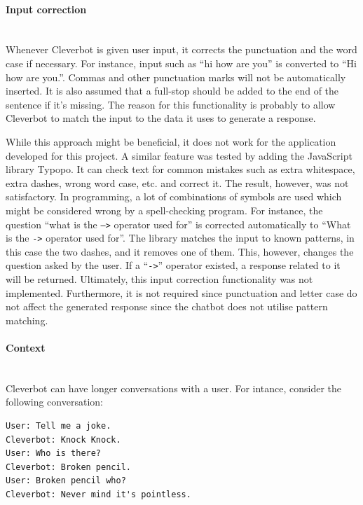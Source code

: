 \documentclass[12pt,a4paper]{article}
\newcommand{\myparagraph}[1]{\paragraph{#1}\mbox{}\\}
\begin{document}


\myparagraph{Input correction}
Whenever Cleverbot is given user input, it corrects the punctuation and the word case if necessary. For instance, input such as “hi how are you” is converted to “Hi how are you.”. Commas and other punctuation marks will not be automatically inserted. It is also assumed that a full-stop should be added to the end of the sentence if it’s missing. The reason for this functionality is probably to allow Cleverbot to match the input to the data it uses to generate a response. 

While this approach might be beneficial, it does not work for the application developed for this project. A similar feature was tested by adding the JavaScript library Typopo. It can check text for common mistakes such as extra whitespace, extra dashes, wrong word case, etc. and correct it. The result, however, was not satisfactory. In programming, a lot of combinations of symbols are used which might be considered wrong by a spell-checking program. For instance, the question \enquote{what is the \texttt{-->} operator used for} is corrected automatically to \enquote{What is the \texttt{->} operator used for}. The library matches the input to known patterns, in this case the two dashes, and it removes one of them. This, however, changes the question asked by the user. If a \enquote{\texttt{->}} operator existed, a response related to it will be returned. Ultimately, this input correction functionality was not implemented. Furthermore, it is not required since punctuation and letter case do not affect the generated response since the chatbot does not utilise pattern matching.

\myparagraph{Context}
Cleverbot can have longer conversations with a user. For intance, consider the following conversation:

\begin{verbatim}
User: Tell me a joke.
Cleverbot: Knock Knock.
User: Who is there?
Cleverbot: Broken pencil.
User: Broken pencil who?
Cleverbot: Never mind it's pointless.
\end{verbatim}
\end{document}
